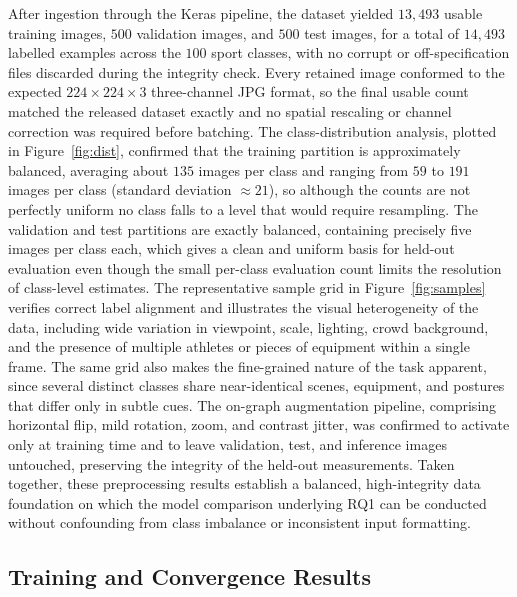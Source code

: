 After ingestion through the Keras pipeline, the dataset yielded $13{,}493$ usable training images, $500$ validation images, and $500$ test images, for a total of $14{,}493$ labelled examples across the $100$ sport classes, with no corrupt or off-specification files discarded during the integrity check.
Every retained image conformed to the expected $224\times224\times3$ three-channel JPG format, so the final usable count matched the released dataset exactly and no spatial rescaling or channel correction was required before batching.
The class-distribution analysis, plotted in Figure~\ref{fig:dist}, confirmed that the training partition is approximately balanced, averaging about $135$ images per class and ranging from $59$ to $191$ images per class (standard deviation $\approx21$), so although the counts are not perfectly uniform no class falls to a level that would require resampling.
The validation and test partitions are exactly balanced, containing precisely five images per class each, which gives a clean and uniform basis for held-out evaluation even though the small per-class evaluation count limits the resolution of class-level estimates.
The representative sample grid in Figure~\ref{fig:samples} verifies correct label alignment and illustrates the visual heterogeneity of the data, including wide variation in viewpoint, scale, lighting, crowd background, and the presence of multiple athletes or pieces of equipment within a single frame.
The same grid also makes the fine-grained nature of the task apparent, since several distinct classes share near-identical scenes, equipment, and postures that differ only in subtle cues.
The on-graph augmentation pipeline, comprising horizontal flip, mild rotation, zoom, and contrast jitter, was confirmed to activate only at training time and to leave validation, test, and inference images untouched, preserving the integrity of the held-out measurements.
Taken together, these preprocessing results establish a balanced, high-integrity data foundation on which the model comparison underlying RQ1 can be conducted without confounding from class imbalance or inconsistent input formatting.

\subsection{Training and Convergence Results}
\label{subsec:res-training}

